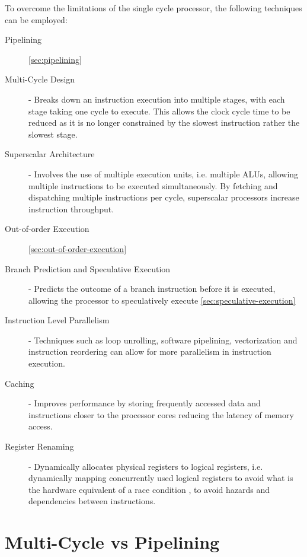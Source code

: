 \documentclass[12pt letter]{report}
\begin{document}
To overcome the limitations of the single cycle processor, the following techniques can be employed:
\begin{description}
  \item[Pipelining] \ref{sec:pipelining}
  \item[Multi-Cycle Design] - Breaks down an instruction execution into multiple stages, with each stage taking one cycle to execute. This allows the clock cycle
        time to be reduced as it is no longer constrained by the slowest instruction rather the slowest stage.
  \item[Superscalar Architecture] - Involves the use of multiple execution units, i.e. multiple ALUs, allowing multiple instructions to be executed
        simultaneously. By fetching and dispatching multiple instructions per cycle, superscalar processors increase instruction throughput.
  \item[Out-of-order Execution] \ref{sec:out-of-order-execution}
  \item[Branch Prediction and Speculative Execution] - Predicts the outcome of a branch instruction before it is executed, allowing the processor to speculatively execute \ref{sec:speculative-execution}
  \item[Instruction Level Parallelism] - Techniques such as loop unrolling, software pipelining, vectorization and instruction reordering can allow for more
        parallelism in instruction execution.
  \item[Caching] - Improves performance by storing frequently accessed data and instructions closer to the processor cores reducing the latency
        of memory access.
  \item[Register Renaming] - Dynamically allocates physical registers to logical registers, i.e. dynamically mapping concurrently used logical registers to avoid what is the hardware equivalent of a race condition , to avoid hazards and dependencies between instructions.

\end{description}

\section{Multi-Cycle vs Pipelining}
\end{document}
